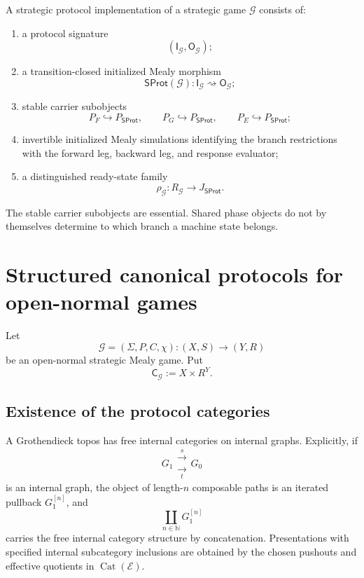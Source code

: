 \begin{definition}
\label{def:strategic-protocol-implementation}
A strategic protocol implementation of a strategic game \(\mathcal G\) consists of:
\begin{enumerate}
  \item a protocol signature
  \[
    (\mathsf I_{\mathcal G},\mathsf O_{\mathcal G});
  \]
  \item a transition-closed initialized Mealy morphism
  \[
    \mathsf{SProt}(\mathcal G):
    \mathsf I_{\mathcal G}
    \rightsquigarrow
    \mathsf O_{\mathcal G};
  \]
  \item stable carrier subobjects
  \[
    P_F\hookrightarrow P_{\mathsf{SProt}},
    \qquad
    P_G\hookrightarrow P_{\mathsf{SProt}},
    \qquad
    P_E\hookrightarrow P_{\mathsf{SProt}};
  \]
  \item invertible initialized Mealy simulations identifying the branch restrictions with the
  forward leg, backward leg, and response evaluator;
  \item a distinguished ready-state family
  \[
    \rho_{\mathcal G}:R_{\mathcal G}\to J_{\mathsf{SProt}}.
  \]
\end{enumerate}
\end{definition}

The stable carrier subobjects are essential. Shared phase objects do not by themselves determine to
which branch a machine state belongs.

\section{Structured canonical protocols for open-normal games}
\label{sec:canonical-protocols}

Let
\[
  \mathcal G=(\Sigma,P,C,\chi):(X,S)\to(Y,R)
\]
be an open-normal strategic Mealy game. Put
\[
  \mathsf C_{\mathcal G}:=X\times R^Y.
\]

\subsection{Existence of the protocol categories}

A Grothendieck topos has free internal categories on internal graphs. Explicitly, if
\[
  G_1
  \mathrel{\substack{\xrightarrow{\ s\ }\\[-1mm]\xrightarrow[\ t\ ]{}}}
  G_0
\]
is an internal graph, the object of length-\(n\) composable paths is an iterated pullback
\(G_1^{[n]}\), and
\[
  \coprod_{n\in\mathbb N}G_1^{[n]}
\]
carries the free internal category structure by concatenation. Presentations with specified internal
subcategory inclusions are obtained by the chosen pushouts and effective quotients in
\(\operatorname{Cat}(\mathcal E)\).

